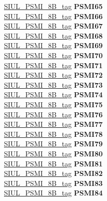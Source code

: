 \begin{DoxyCompactItemize}
\begin{tabbing}
\>\>\mbox{\hyperlink{unionSIUL__PSMI__8B__tag}{SIUL\_PSMI\_8B\_tag}} {\bfseries PSMI65}\\
\>\>\mbox{\hyperlink{unionSIUL__PSMI__8B__tag}{SIUL\_PSMI\_8B\_tag}} {\bfseries PSMI66}\\
\>\>\mbox{\hyperlink{unionSIUL__PSMI__8B__tag}{SIUL\_PSMI\_8B\_tag}} {\bfseries PSMI67}\\
\>\>\mbox{\hyperlink{unionSIUL__PSMI__8B__tag}{SIUL\_PSMI\_8B\_tag}} {\bfseries PSMI68}\\
\>\>\mbox{\hyperlink{unionSIUL__PSMI__8B__tag}{SIUL\_PSMI\_8B\_tag}} {\bfseries PSMI69}\\
\>\>\mbox{\hyperlink{unionSIUL__PSMI__8B__tag}{SIUL\_PSMI\_8B\_tag}} {\bfseries PSMI70}\\
\>\>\mbox{\hyperlink{unionSIUL__PSMI__8B__tag}{SIUL\_PSMI\_8B\_tag}} {\bfseries PSMI71}\\
\>\>\mbox{\hyperlink{unionSIUL__PSMI__8B__tag}{SIUL\_PSMI\_8B\_tag}} {\bfseries PSMI72}\\
\>\>\mbox{\hyperlink{unionSIUL__PSMI__8B__tag}{SIUL\_PSMI\_8B\_tag}} {\bfseries PSMI73}\\
\>\>\mbox{\hyperlink{unionSIUL__PSMI__8B__tag}{SIUL\_PSMI\_8B\_tag}} {\bfseries PSMI74}\\
\>\>\mbox{\hyperlink{unionSIUL__PSMI__8B__tag}{SIUL\_PSMI\_8B\_tag}} {\bfseries PSMI75}\\
\>\>\mbox{\hyperlink{unionSIUL__PSMI__8B__tag}{SIUL\_PSMI\_8B\_tag}} {\bfseries PSMI76}\\
\>\>\mbox{\hyperlink{unionSIUL__PSMI__8B__tag}{SIUL\_PSMI\_8B\_tag}} {\bfseries PSMI77}\\
\>\>\mbox{\hyperlink{unionSIUL__PSMI__8B__tag}{SIUL\_PSMI\_8B\_tag}} {\bfseries PSMI78}\\
\>\>\mbox{\hyperlink{unionSIUL__PSMI__8B__tag}{SIUL\_PSMI\_8B\_tag}} {\bfseries PSMI79}\\
\>\>\mbox{\hyperlink{unionSIUL__PSMI__8B__tag}{SIUL\_PSMI\_8B\_tag}} {\bfseries PSMI80}\\
\>\>\mbox{\hyperlink{unionSIUL__PSMI__8B__tag}{SIUL\_PSMI\_8B\_tag}} {\bfseries PSMI81}\\
\>\>\mbox{\hyperlink{unionSIUL__PSMI__8B__tag}{SIUL\_PSMI\_8B\_tag}} {\bfseries PSMI82}\\
\>\>\mbox{\hyperlink{unionSIUL__PSMI__8B__tag}{SIUL\_PSMI\_8B\_tag}} {\bfseries PSMI83}\\
\>\>\mbox{\hyperlink{unionSIUL__PSMI__8B__tag}{SIUL\_PSMI\_8B\_tag}} {\bfseries PSMI84}\\

\end{tabbing}
\end{DoxyCompactItemize}
